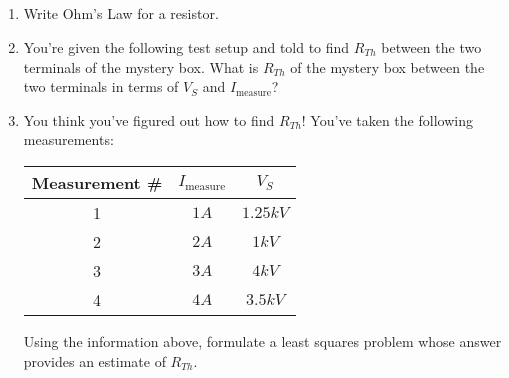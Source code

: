 \\ \\
\\ \\
\begin{enumerate}
    \item{Write Ohm's Law for a resistor.}
    

    \item{You're given the following test setup and told to find $R_{Th}$ between the two terminals of the mystery box. What is $R_{Th}$ of the mystery box between the two terminals in terms of $V_S$ and $I_\text{measure}$?}
    

    
    \item{
        You think you've figured out how to find $R_{Th}$! You've taken the following measurements:
        \begin{center}
            \begin{tabular}{|c|c|c|}
                \hline
                Measurement \# & $I_\text{measure}$& $V_S$\\\hline
                1 & $1A$ & $1.25kV$\\\hline
                2 & $2A$ & $1kV$\\\hline
                3 & $3A$ & $4kV$\\\hline
                4 & $4A$ & $3.5kV$
            \end{tabular}
        \end{center}
        Using the information above, formulate a least squares problem whose answer provides an estimate of $R_{Th}$.
    }
    

\end{enumerate}
